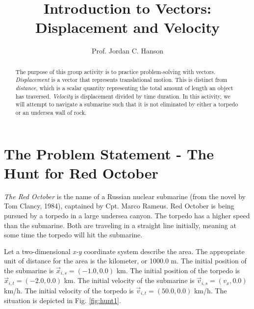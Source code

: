 \documentclass{article}
\begin{document}
\title{Introduction to Vectors: Displacement and Velocity}
\author{Prof. Jordan C. Hanson}

\maketitle

\begin{abstract}
The purpose of this group activity is to practice problem-solving with vectors.  \textit{Displacement} is a vector that represents translational motion.  This is distinct from \textit{distance}, which is a scalar quantity representing the total amount of length an object has traversed.  \textit{Velocity} is displacement divided by time duration.  In this activity, we will attempt to navigate a submarine such that it is not eliminated by either a torpedo or an undersea wall of rock.
\end{abstract}

\section{The Problem Statement - The Hunt for Red October}

\textit{The Red October} is the name of a Russian nuclear submarine (from the novel by Tom Clancy, 1984), captained by Cpt. Marco Rameus.  Red October is being pursued by a torpedo in a large undersea canyon.  The torpedo has a higher speed than the submarine.  Both are traveling in a straight line initially, meaning at some time the torpedo will hit the submarine.

Let a two-dimensional \textit{x-y} coordinate system describe the area.  The appropriate unit of distance for the area is the kilometer, or 1000.0 m.  The initial position of the submarine is $\vec{x}_{i,s} = (-1.0, 0.0)$ km.  The initial position of the torpedo is $\vec{x}_{i,t} = (-2.0, 0.0)$ km.  The initial velocity of the submarine is $\vec{v}_{i,s} = (v_x,0.0)$ km/h.  The initial velocity of the torpedo is $\vec{v}_{i,t} = (50.0,0.0)$ km/h.  The situation is depicted in Fig. \ref{fig:hunt1}.
\end{document}
